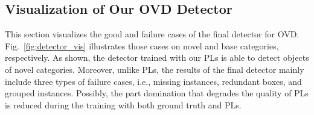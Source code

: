 \documentclass[runningheads]{llncs}
\begin{document}
\subsection{Visualization of Our OVD Detector}

This section visualizes the good and failure cases of the final detector for OVD. Fig.~\ref{fig:detector_vis} illustrates those cases on novel and base categories, respectively. 
As shown, the detector trained with our PLs is able to detect objects of novel categories. Moreover, unlike PLs, the results of the final detector mainly include three types of failure cases, i.e., missing instances, redundant boxes, and grouped instances. Possibly, the part domination that degrades the quality of PLs is reduced during the training with both ground truth and PLs.
\end{document}
